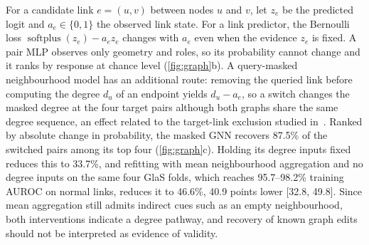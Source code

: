 For a candidate link $e=(u,v)$ between nodes $u$ and $v$, let $z_e$ be the predicted logit and $a_e\in\{0,1\}$ the observed link state. For a link predictor, the Bernoulli loss $\operatorname{softplus}(z_e)-a_ez_e$ changes with $a_e$ even when the evidence $z_e$ is fixed. A pair MLP observes only geometry and roles, so its probability cannot change and it ranks by response at chance level (\cref{fig:graph}b). A query-masked neighbourhood model has an additional route: removing the queried link before computing the degree $d_u$ of an endpoint yields $d_u-a_e$, so a switch changes the masked degree at the four target pairs although both graphs share the same degree sequence, an effect related to the target-link exclusion studied in~\cite{zhu2024spot}. Ranked by absolute change in probability, the masked GNN recovers 87.5\% of the switched pairs among its top four (\cref{fig:graph}c). Holding its degree inputs fixed reduces this to 33.7\%, and refitting with mean neighbourhood aggregation and no degree inputs on the same four GlaS folds, which reaches 95.7--98.2\% training AUROC on normal links, reduces it to 46.6\%, 40.9 points lower [32.8, 49.8]. Since mean aggregation still admits indirect cues such as an empty neighbourhood, both interventions indicate a degree pathway, and recovery of known graph edits should not be interpreted as evidence of validity.

